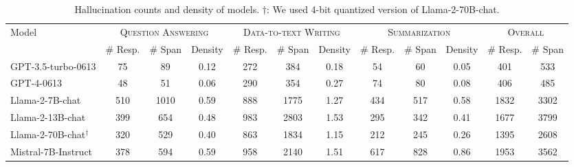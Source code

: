 \documentclass[11pt]{article}
\begin{document}
\begin{table}[!ht]
\centering
\scriptsize
\begin{tabular}{l|ccccccccccc}
\toprule
\multirow{2}{*}{Model}  & \multicolumn{3}{c}{\textsc{Question Answering}} &\multicolumn{3}{c}{\textsc{Data-to-text Writing}} & \multicolumn{3}{c}{\textsc{Summarization}} &\multicolumn{2}{c}{\textsc{Overall}}\\
\cmidrule(lr){2-4} \cmidrule(lr){5-7} \cmidrule(lr){8-10}  \cmidrule(lr){11-12}
    & \# Resp. & \# Span & Density & \# Resp.  & \# Span & Density & \# Resp.  & \# Span & Density & \# Resp.  & \# Span\\
\midrule
GPT-3.5-turbo-0613    & 75 & 89 & 0.12 & 272 & 384 & 0.18 & 54 & 60 & 0.05 & 401  &   533    \\
GPT-4-0613   & 48 &  51 & 0.06 & 290 & 354 &  0.27 &  74 &  80 & 0.08 & 406  & 485    \\
Llama-2-7B-chat  & 510 & 1010 & 0.59 & 888 & 1775 & 1.27 & 434 & 517 & 0.58 & 1832 &  3302   \\
Llama-2-13B-chat    & 399 & 654 & 0.48  & 983 & 2803 & 1.53 & 295 & 342 & 0.41 & 1677 &  3799   \\
Llama-2-70B-chat$^{\dagger}$  & 320 & 529 & 0.40 & 863 & 1834 & 1.15 & 212 & 245 & 0.26  & 1395 & 2608    \\
Mistral-7B-Instruct  & 378 & 594 & 0.59 & 958 & 2140 & 1.51 & 617 & 828 & 0.86 & 1953 & 3562   \\
\bottomrule
\end{tabular}
\caption{Hallucination counts and density of models. 
$\dagger$: We used 4-bit quantized version of Llama-2-70B-chat.}
\label{tab:halu-model}
\end{table}
\end{document}
